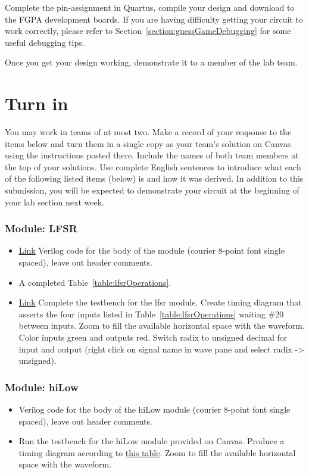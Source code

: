 Complete the pin-assignment in Quartus, compile your design and download to the
FGPA development boards.  If you are having difficulty getting your circuit to work
correctly, please refer to Section~\ref{section:guessGameDebugging} for some 
useful debugging tips. 

Once you get your design working, demonstrate it to a member of the 
lab team.  


\section{Turn in}

You may work in teams of at most two. Make a record of your response to
the items below and turn them in a single copy as your team's solution
on Canvas using the instructions posted there. Include the names of both
team members at the top of your solutions. Use complete English
sentences to introduce what each of the following listed items (below)
is and how it was derived. In addition to this submission, you will be
expected to demonstrate your circuit at the beginning of your lab
section next week.

\subsubsection{Module: LFSR }
\begin{itemize}
\item
  \protect\hyperlink{lfsr_verilog}{Link} Verilog code for the body of
  the module (courier 8-point font single spaced), leave out header
  comments.
\item A completed Table~\ref{table:lfsrOperations}.
\item
  \protect\hyperlink{lfsr_testbench}{Link} Complete the testbench for
  the lfsr module. Create timing diagram that asserts the four inputs
  listed in Table~\ref{table:lfsrOperations} waiting \#20 between inputs. Zoom to fill the
  available horizontal space with the waveform. Color inputs green and
  outputs red. Switch radix to unsigned decimal for input and output
  (right click on signal name in wave pane and select radix
  -\textgreater{} unsigned).
\end{itemize}

\subsubsection{Module: hiLow}


\begin{itemize}
\item
  Verilog code for the body of the hiLow module (courier 8-point
  font single spaced), leave out header comments.
\item
  Run the testbench for the hiLow module provided on Canvas.
  Produce a timing diagram according to
  \hyperlink{hlgg:signalColor}{this table}. Zoom to
  fill the available horizontal space with the waveform. 
\end{itemize}

